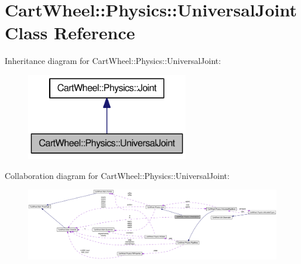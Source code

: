 \hypertarget{classCartWheel_1_1Physics_1_1UniversalJoint}{
\section{CartWheel::Physics::UniversalJoint Class Reference}
\label{classCartWheel_1_1Physics_1_1UniversalJoint}
}


Inheritance diagram for CartWheel::Physics::UniversalJoint:\nopagebreak
\begin{figure}[H]
\begin{center}
\leavevmode
\includegraphics[width=202pt]{classCartWheel_1_1Physics_1_1UniversalJoint__inherit__graph}
\end{center}
\end{figure}


Collaboration diagram for CartWheel::Physics::UniversalJoint:\nopagebreak
\begin{figure}[H]
\begin{center}
\leavevmode
\includegraphics[width=400pt]{classCartWheel_1_1Physics_1_1UniversalJoint__coll__graph}
\end{center}
\end{figure}
